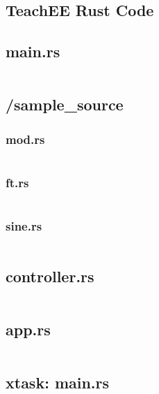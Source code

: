 \documentclass[letterpaper,11pt]{article}
\begin{document}
\begin{appendices}
    \section{TeachEE Rust Code} \label{appendix:software}

    \subsection{main.rs}
    \inputminted[linenos,breaklines]{rust}{../../software/teachee-desktop/src/main.rs}

    \subsection{/sample\_source} \label{appendix:software-usb_manager}

    \subsubsection{mod.rs} \label{appendix:software-mod}
    \inputminted[linenos,breaklines]{rust}{../../software/teachee-desktop/src/sample_source/mod.rs}

    \subsubsection{ft.rs} \label{appendix:software-ft}
    \inputminted[linenos,breaklines]{rust}{../../software/teachee-desktop/src/sample_source/ft.rs}

    \subsubsection{sine.rs} \label{appendix:software-sine}
    \inputminted[linenos,breaklines]{rust}{../../software/teachee-desktop/src/sample_source/sine.rs}

    \subsection{controller.rs} \label{appendix:software-controller}
    \inputminted[linenos,breaklines]{rust}{../../software/teachee-desktop/src/controller.rs}

    \subsection{app.rs} \label{appendix:software-app}
    \inputminted[linenos,breaklines]{rust}{../../software/teachee-desktop/src/app.rs}

    \subsection{xtask: main.rs} \label{appendix:software-script}
    \inputminted[linenos,breaklines]{rust}{../../software/teachee-desktop/xtask/src/main.rs}

    \end{appendices}
\end{document}
